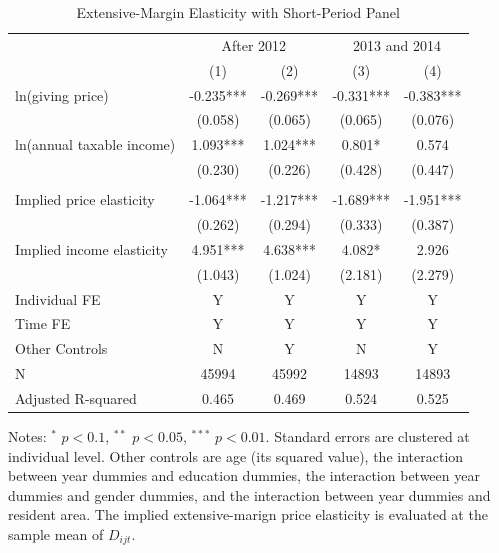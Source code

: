 \documentclass[
  11pt,
  a4paper,
]{article}
\begin{document}
\begin{table}

\caption{\label{tab:ShortExtensive}Extensive-Margin Elasticity with Short-Period Panel}
\centering
\fontsize{9}{11}\selectfont
\begin{threeparttable}
\begin{tabular}[t]{lcccc}
\toprule
\multicolumn{1}{c}{ } & \multicolumn{2}{c}{After 2012} & \multicolumn{2}{c}{2013 and 2014} \\
\cmidrule(l{3pt}r{3pt}){2-3} \cmidrule(l{3pt}r{3pt}){4-5}
 & (1) & (2) & (3) & (4)\\
\midrule
ln(giving price) & -0.235*** & -0.269*** & -0.331*** & -0.383***\\
 & (0.058) & (0.065) & (0.065) & (0.076)\\
ln(annual taxable income) & 1.093*** & 1.024*** & 0.801* & 0.574\\
 & (0.230) & (0.226) & (0.428) & (0.447)\\
 &  &  &  & \\
Implied price elasticity & -1.064*** & -1.217*** & -1.689*** & -1.951***\\
 & (0.262) & (0.294) & (0.333) & (0.387)\\
Implied income elasticity & 4.951*** & 4.638*** & 4.082* & 2.926\\
 & (1.043) & (1.024) & (2.181) & (2.279)\\
Individual FE & Y & Y & Y & Y\\
Time FE & Y & Y & Y & Y\\
Other Controls & N & Y & N & Y\\
N & 45994 & 45992 & 14893 & 14893\\
Adjusted R-squared & 0.465 & 0.469 & 0.524 & 0.525\\
\bottomrule
\end{tabular}
\begin{tablenotes}
\item Notes: $^{*}$ $p < 0.1$, $^{**}$ $p < 0.05$, $^{***}$ $p < 0.01$. Standard errors are clustered at individual level. Other controls are age (its squared value), the interaction between year dummies and education dummies, the interaction between year dummies and gender dummies, and the interaction between year dummies and resident area. The implied extensive-marign price elasticity is evaluated at the sample mean of $D_{ijt}$.
\end{tablenotes}
\end{threeparttable}
\end{table}
\end{document}
